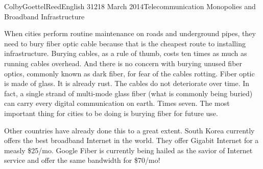 \documentclass[12pt]{article}
\begin{document}
\begin{mla}{Colby}{Goettel}{Reed}{English 312}{18 March 2014}{Telecommunication Monopolies and Broadband Infrastructure}

When cities perform routine maintenance on roads and underground pipes, they need to bury fiber optic cable because that is the cheapest route to installing infrastructure. Burying cables, as a rule of thumb, costs ten times as much as running cables overhead. And there is no concern with burying unused fiber optics, commonly known as dark fiber, for fear of the cables rotting. Fiber optic is made of glass. It is already rust. The cables do not deteriorate over time. In fact, a single strand of multi-mode glass fiber (what is commonly being buried) can carry every digital communication on earth. Times seven. The most important thing for cities to be doing is burying fiber for future use.

Other countries have already done this to a great extent. South Korea currently offers the best broadband Internet in the world. They offer Gigabit Internet for a measly \$25/mo. Google Fiber is currently being hailed as the savior of Internet service and offer the same bandwidth for \$70/mo!


\end{mla}
\end{document}

